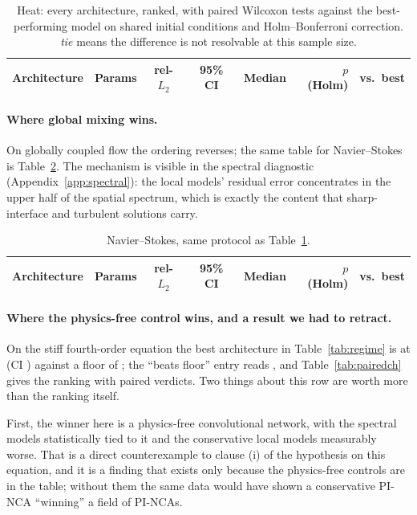 \documentclass{article}
\begin{document}
\begin{table}[t]
\centering
\caption{Heat: every architecture, ranked, with paired Wilcoxon tests against the
best-performing model on shared initial conditions and Holm--Bonferroni correction.
\emph{tie} means the difference is not resolvable at this sample size.}
\label{tab:pairedheat}
\small
\begin{tabular}{lrcccrl}
\toprule
Architecture & Params & rel-$L_2$ & 95\% CI & Median & $p$ (Holm) & vs.\ best \\
\midrule

\bottomrule
\end{tabular}
\end{table}

\paragraph{Where global mixing wins.} On globally coupled flow the ordering reverses; the
same table for Navier--Stokes is Table~\ref{tab:pairedns}. The mechanism is visible in the
spectral diagnostic (Appendix~\ref{app:spectral}): the local models' residual error
concentrates in the upper half of the spatial spectrum, which is exactly the content that
sharp-interface and turbulent solutions carry.

\begin{table}[t]
\centering
\caption{Navier--Stokes, same protocol as Table~\ref{tab:pairedheat}.}
\label{tab:pairedns}
\small
\begin{tabular}{lrcccrl}
\toprule
Architecture & Params & rel-$L_2$ & 95\% CI & Median & $p$ (Holm) & vs.\ best \\
\midrule

\bottomrule
\end{tabular}
\end{table}

\paragraph{Where the physics-free control wins, and a result we had to retract.} On the
stiff fourth-order equation the best architecture in Table~\ref{tab:regime} is
\bestCahnHilliard{} at \bestCahnHilliardErr{} (CI \bestCahnHilliardCI{}) against a floor of
\floorCahnHilliard{}; the ``beats floor'' entry reads \beatsFloorCahnHilliard{}, and
Table~\ref{tab:pairedch} gives the ranking with paired verdicts. Two things about this row
are worth more than the ranking itself.

First, the winner here is a physics-free convolutional network, with the spectral models
statistically tied to it and the conservative local models measurably worse. That is a
direct counterexample to clause (i) of the hypothesis on this equation, and it is a finding
that exists only because the physics-free controls are in the table; without them the same
data would have shown a conservative PI-NCA ``winning'' a field of PI-NCAs.
\end{document}
